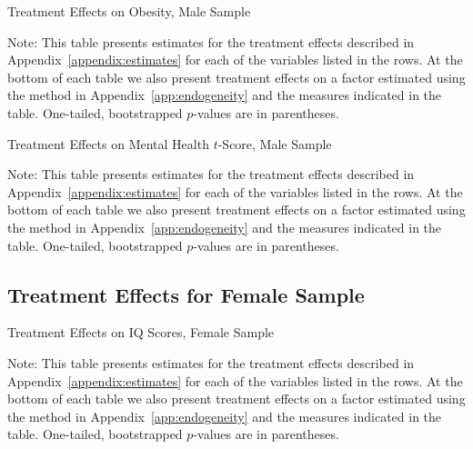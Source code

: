 	\begin{table}[H]
     \caption{Treatment Effects on Obesity, Male Sample}
     \label{table:abccare_rslt_male_cat14}
	
	\end{table} 
\begin{spacing}{1}
\begin{footnotesize}
\noindent Note: This table presents estimates for the treatment effects described in Appendix~\ref{appendix:estimates} for each of the variables listed in the rows. At the bottom of each table we also present treatment effects on a factor estimated using the method in Appendix~\ref{app:endogeneity} and the measures indicated in the table. One-tailed, bootstrapped $p$-values are in parentheses.
\end{footnotesize}
\end{spacing}

	\begin{table}[H]
     \caption{Treatment Effects on Mental Health $t$-Score, Male Sample}
     \label{table:abccare_rslt_male_cat15}
	
	\end{table} 
\begin{spacing}{1}
\begin{footnotesize}
\noindent Note: This table presents estimates for the treatment effects described in Appendix~\ref{appendix:estimates} for each of the variables listed in the rows. At the bottom of each table we also present treatment effects on a factor estimated using the method in Appendix~\ref{app:endogeneity} and the measures indicated in the table. One-tailed, bootstrapped $p$-values are in parentheses.
\end{footnotesize}
\end{spacing}




\subsection{Treatment Effects for Female Sample}


	\begin{table}[H]
     \caption{Treatment Effects on IQ Scores, Female Sample}
     \label{table:abccare_rslt_female_cat0}
	
	\end{table}
\begin{spacing}{1}
\begin{footnotesize}
\noindent Note: This table presents estimates for the treatment effects described in Appendix~\ref{appendix:estimates} for each of the variables listed in the rows. At the bottom of each table we also present treatment effects on a factor estimated using the method in Appendix~\ref{app:endogeneity} and the measures indicated in the table. One-tailed, bootstrapped $p$-values are in parentheses.
\end{footnotesize}
\end{spacing}

